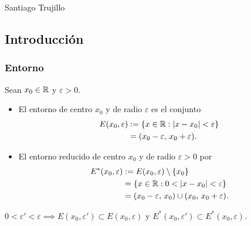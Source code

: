 \documentclass[11pt,a4paper]{article}
\newcommand{\Er}{E^{*}}                 %
\begin{document}
\maketitle
\vspace{-1.6em}
\begin{center}
  {\normalsize Santiago Trujillo\par}
\end{center}
\vspace{0.5em}
\tableofcontents



\subsection{Introducción}

\subsubsection*{Entorno}

\begin{definicion}
Sean $x_0\in\mathbb{R}$ y $\varepsilon>0$.
\begin{itemize}
  \item El entorno de centro $x_0$ y de radio $\varepsilon$ es el conjunto
  \begin{align*}
    E(x_0,\varepsilon) &:= \{x\in\mathbb{R} : \lvert x-x_0\rvert<\varepsilon\}\\
    &= (x_0-\varepsilon,\, x_0+\varepsilon).
  \end{align*}
  \item El entorno reducido de centro $x_0$ y de radio $\varepsilon>0$ por
  \begin{align*}
    \Er(x_0,\varepsilon) &:= E(x_0,\varepsilon)\setminus\{x_0\}\\
    &= \{x\in\R : 0<\abs{x-x_0}<\varepsilon\}\\
    &= (x_0-\varepsilon,\, x_0)\cup(x_0,\, x_0+\varepsilon).
  \end{align*}
\end{itemize}
\end{definicion}

\begin{observacion}
$0<\varepsilon'<\varepsilon \implies E(x_0,\varepsilon')\subset E(x_0,\varepsilon)$ y $\Er(x_0,\varepsilon')\subset \Er(x_0,\varepsilon)$.
\end{observacion}
\end{document}
